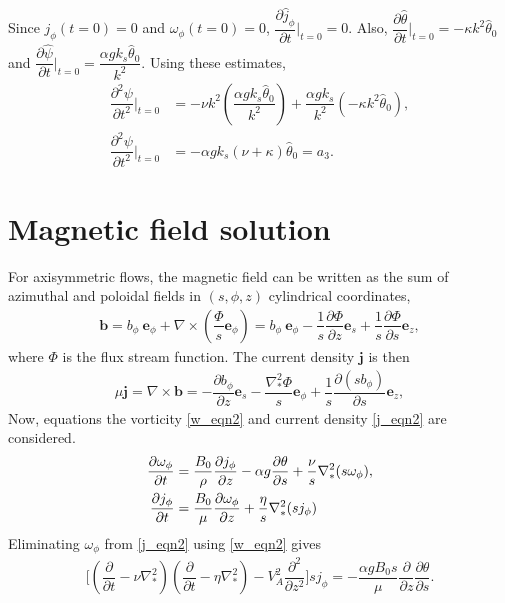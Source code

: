 \documentclass[12pt,psfig]{article}
\begin{document}
Since $j_\phi(t=0)=0$ and $\omega_\phi(t=0)=0$, $\dfrac{\partial \hat{j}_\phi}{\partial t}\bigg|_{t=0}=0$. Also, $\dfrac{\partial \hat{\theta}}{\partial t}\bigg|_{t=0}=-\kappa k^2\hat{\theta}_0$ and $\dfrac{\partial \hat{\psi}}{\partial t}\bigg|_{t=0}=\dfrac{\alpha gk_s\hat{\theta}_0}{k^2}$. Using these estimates, 
\begin{align*}
\dfrac{\partial^2\psi }{\partial t^2}\bigg|_{t=0}&=-\nu k^2\left(\dfrac{\alpha g k_s \hat{\theta}_0}{k^2}\right)+\dfrac{\alpha g k_s}{k^2}\left(-\kappa k^2\hat{\theta}_0\right),\\
\dfrac{\partial^2\psi }{\partial t^2}\bigg|_{t=0}&=- \alpha g k_s (\nu+\kappa)\hat{\theta}_0=a_3.
\end{align*}



\section{Magnetic field solution}
For axisymmetric flows,  the magnetic field can be written as the sum of azimuthal and poloidal fields in $(s,\phi,z)$ cylindrical coordinates,
\begin{align}
\bm b= b_\phi \ \bm e_\phi + \nabla \times \left(\dfrac{\Phi}{s} \bm e_\phi\right)=b_\phi \ \bm e_\phi-\dfrac{1}{s}\dfrac{\partial \Phi}{\partial z}\bm e_s+\dfrac{1}{s}\dfrac{\partial \Phi}{\partial s} \bm e_z, \label{b}
\end{align} 
where $\Phi$ is the flux stream function.
The current density $\bm j$ is then
\begin{align}
\mu\bm j = \nabla \times \bm b =-\dfrac{\partial b_\phi}{\partial z} \bm e_s - \dfrac{\nabla_*^2\Phi}{s} \bm e_\phi+\dfrac{1}{s}\dfrac{\partial (sb_\phi)}{\partial s} \bm e_z, \label{j}
\end{align}
Now, equations the vorticity \eqref{w_eqn2} and current density \eqref{j_eqn2} are considered.
\begin{align*}
\dfrac{\partial \omega_\phi}{\partial t}&=\dfrac{B_0}{\rho}\dfrac{\partial j_\phi}{\partial z}-\alpha g\dfrac{\partial \theta}{\partial s}+ \dfrac{\nu}{s}\nabla_*^2(s\omega_\phi), \\
\dfrac{\partial j_\phi}{\partial t}&=\dfrac{B_0}{\mu}\dfrac{\partial \omega_\phi}{\partial z}+ \dfrac{\eta}{s}\nabla_*^2(s j_\phi)\label.
\end{align*}
Eliminating $\omega_\phi$ from \eqref{j_eqn2} using \eqref{w_eqn2} gives
\begin{align*}
\Biggl[\left(\dfrac{\partial}{\partial t}-\nu\nabla^2_*\right)\left(\dfrac{\partial}{\partial t}-\eta\nabla^2_*\right)-V_A^2\dfrac{\partial^2}{\partial z^2}\Biggr]sj_\phi=-\dfrac{\alpha g  B_0 s}{\mu}\dfrac{\partial }{\partial z}\dfrac{\partial \theta}{\partial s}.
\end{align*}
\end{document}
